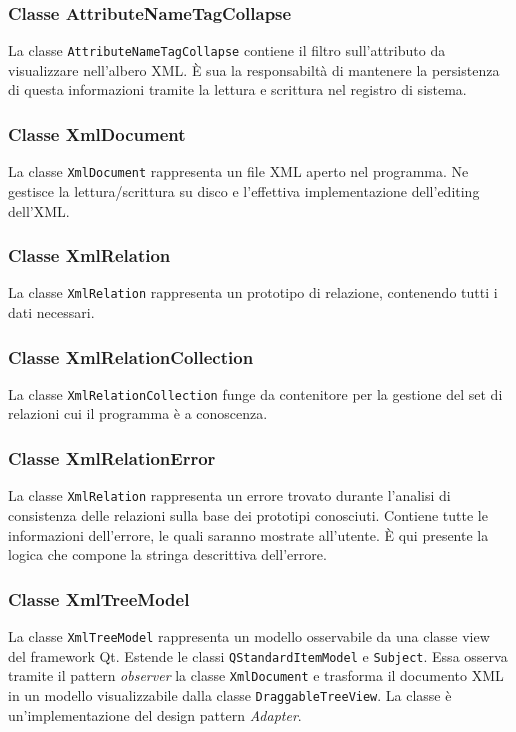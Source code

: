 	\subsubsection{Classe AttributeNameTagCollapse}
		La classe \texttt{AttributeNameTagCollapse} contiene il filtro sull'attributo da visualizzare nell'albero XML. È sua la responsabiltà di mantenere la persistenza di questa informazioni tramite la lettura e scrittura nel registro di sistema.
		
	\subsubsection{Classe XmlDocument}
		La classe \texttt{XmlDocument} rappresenta un file XML aperto nel programma. Ne gestisce la lettura/scrittura su disco e l'effettiva implementazione dell'editing dell'XML.

	\subsubsection{Classe XmlRelation}
		La classe \texttt{XmlRelation} rappresenta un prototipo di relazione, contenendo tutti i dati necessari.
		
	\subsubsection{Classe XmlRelationCollection}
		La classe \texttt{XmlRelationCollection} funge da contenitore per la gestione del set di relazioni cui il programma è a conoscenza.

	\subsubsection{Classe XmlRelationError}
		La classe \texttt{XmlRelation} rappresenta un errore trovato durante l'analisi di consistenza delle relazioni sulla base dei prototipi conosciuti. Contiene tutte le informazioni dell'errore, le quali saranno mostrate all'utente. È qui presente la logica che compone la stringa descrittiva dell'errore.
		
	\subsubsection{Classe XmlTreeModel}
		La classe \texttt{XmlTreeModel} rappresenta un modello osservabile da una classe view del framework Qt. Estende le classi \texttt{QStandardItemModel} e \texttt{Subject}. Essa osserva tramite il pattern \textit{observer} la classe \texttt{XmlDocument} e trasforma il documento XML in un modello visualizzabile dalla classe \texttt{DraggableTreeView}. La classe è un'implementazione del design pattern \textit{Adapter}.
		
